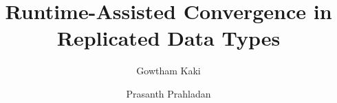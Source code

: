 \documentclass[sigplan,screen]{acmart}
\begin{document}
\title[]{Runtime-Assisted Convergence in Replicated Data Types}



\author{Gowtham Kaki}

\author{Prasanth Prahladan}
\end{document}
